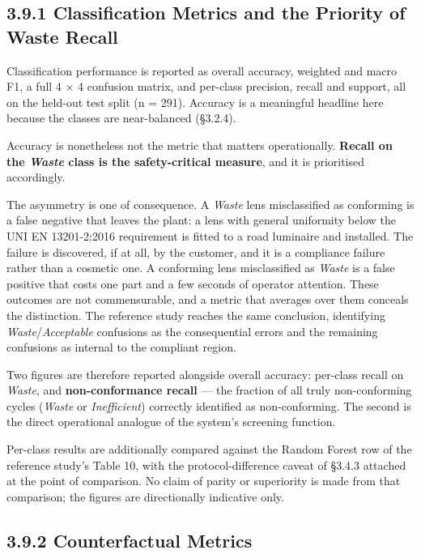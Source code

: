 \hypertarget{classification-metrics-and-the-priority-of-waste-recall}{%
\subsection{3.9.1 Classification Metrics and the Priority of Waste Recall}\label{classification-metrics-and-the-priority-of-waste-recall}}

Classification performance is reported as overall accuracy, weighted and macro F1, a full 4 × 4 confusion matrix, and per-class precision, recall and support, all on the held-out test split (n = 291). Accuracy is a meaningful headline here because the classes are near-balanced (§3.2.4).

Accuracy is nonetheless not the metric that matters operationally. \textbf{Recall on the \emph{Waste} class is the safety-critical measure}, and it is prioritised accordingly.

The asymmetry is one of consequence. A \emph{Waste} lens misclassified as conforming is a false negative that leaves the plant: a lens with general uniformity below the UNI EN 13201-2:2016 requirement is fitted to a road luminaire and installed. The failure is discovered, if at all, by the customer, and it is a compliance failure rather than a cosmetic one. A conforming lens misclassified as \emph{Waste} is a false positive that costs one part and a few seconds of operator attention. These outcomes are not commensurable, and a metric that averages over them conceals the distinction. The reference study reaches the same conclusion, identifying \emph{Waste}/\emph{Acceptable} confusions as the consequential errors and the remaining confusions as internal to the compliant region.

Two figures are therefore reported alongside overall accuracy: per-class recall on \emph{Waste}, and \textbf{non-conformance recall} --- the fraction of all truly non-conforming cycles (\emph{Waste} or \emph{Inefficient}) correctly identified as non-conforming. The second is the direct operational analogue of the system's screening function.

Per-class results are additionally compared against the Random Forest row of the reference study's Table 10, with the protocol-difference caveat of §3.4.3 attached at the point of comparison. No claim of parity or superiority is made from that comparison; the figures are directionally indicative only.

\hypertarget{counterfactual-metrics}{%
\subsection{3.9.2 Counterfactual Metrics}\label{counterfactual-metrics}}

